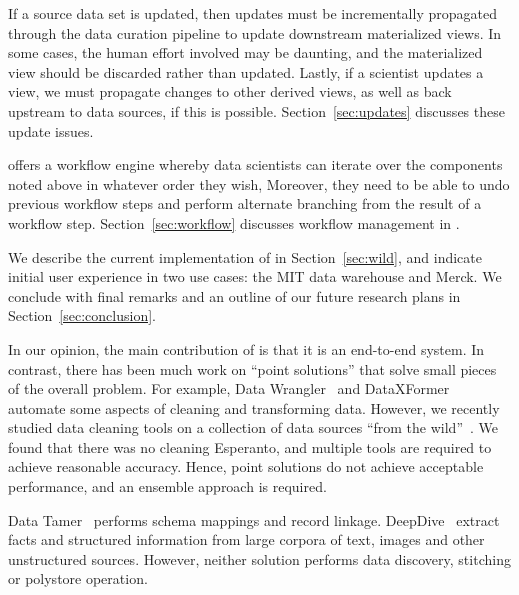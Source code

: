   If a source data set is updated, then updates must be incrementally propagated through the data curation pipeline to update downstream materialized views. In some cases, the human effort involved may be daunting, and the materialized view should be discarded rather than updated. Lastly, if a scientist updates a view, we must propagate changes to other derived views, as well as back upstream to data sources, if this is possible. Section~\ref{sec:updates} discusses these update issues.



\stitle{[Workflow]} \dcv offers a workflow engine whereby data scientists can iterate over the components noted above in whatever order they wish,  Moreover, they need to be able to undo previous workflow steps and perform alternate branching from the result of a workflow step.  Section~\ref{sec:workflow} discusses workflow management in \dcv.


We describe the current implementation of \dcv in Section~\ref{sec:wild}, and indicate initial user experience in two use cases: the MIT data warehouse and Merck. We conclude with final remarks and an outline of our future research plans in Section~\ref{sec:conclusion}.


In our opinion, the main contribution of \dcv is that it is an end-to-end system. In contrast, there has been much work on ``point solutions'' that solve small pieces of the overall problem. For example, Data Wrangler~\cite{2011-wrangler} and DataXFormer~\cite{DBLP:conf/icde/AbedjanMIOPS16} automate some aspects of cleaning and transforming data.  However, we recently studied data cleaning tools on a collection of data sources ``from the wild''~\cite{DBLP:journals/pvldb/AbedjanCDFIOPST16}. We found that there was no cleaning Esperanto, and multiple tools are required to achieve reasonable accuracy.  Hence, point solutions do not achieve acceptable performance, and an ensemble approach is required. 

Data Tamer~\cite{DBLP:conf/cidr/StonebrakerBIBCZPX13} performs schema mappings and record linkage. DeepDive~\cite{DBLP:journals/pvldb/ShinWWSZR15} extract facts and structured information from large corpora of text, images and other unstructured sources. However, neither solution performs data discovery, stitching or polystore operation.

